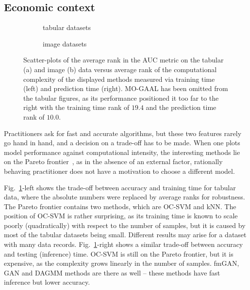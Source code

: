 \subsection{Economic context}
\label{sec:economic_context}
\begin{figure*}
    \centering
    \begin{subfigure}{\columnwidth}
        \centering
        \small
        \resizebox {0.66\linewidth}{!}{
            
        }
        \caption{tabular datasets}
        \label{fig:tabular_total_eval_t_fit_t_combined}
    \end{subfigure}
    \begin{subfigure}{\columnwidth}
        \centering
        \small
        \resizebox {0.66\linewidth}{!}{
            
        }
        \caption{image datasets}
        \label{fig:images_total_eval_t_fit_t_combined}
    \end{subfigure}
    \caption{Scatter-plots of the average rank in the AUC metric on the tabular  (a) and image (b) data versus average rank of the computational complexity of the displayed methods measured via training time (left) and prediction time (right). MO-GAAL has been omitted from the tabular figures, as its performance positioned it too far to the right with the training time rank of $19.4$ and the prediction time rank of $10.0$.}
    \label{fig:images_total_eval_t_fit_t_combined_joined}
\end{figure*}

Practitioners ask for fast and accurate algorithms, but these two features rarely go hand in hand, and a decision on a trade-off has to be made. When one plots model performance against computational intensity, the interesting methods lie on the Pareto frontier~\cite{ishizaka2013multi}, as in the absence of an external factor, rationally behaving practitioner does not have a motivation to choose a different model.

Fig.~\ref{fig:tabular_total_eval_t_fit_t_combined}-left shows the trade-off between accuracy and training time for tabular data, where the absolute numbers were replaced by average ranks for robustness. The Pareto frontier contains two methods, which are OC-SVM and kNN. The position of OC-SVM is rather surprising, as its training time is known to scale poorly (quadratically) with respect to the number of samples, but it is caused by most of the tabular datasets being small. Different results may arise for a dataset with many data records. Fig.~\ref{fig:tabular_total_eval_t_fit_t_combined}-right shows a similar trade-off between accuracy and testing (inference) time. OC-SVM is still on the Pareto frontier, but it is expensive, as the complexity grows linearly in the number of samples. fmGAN, GAN and DAGMM methods are there as well -- these methods have fast inference but lower accuracy.


